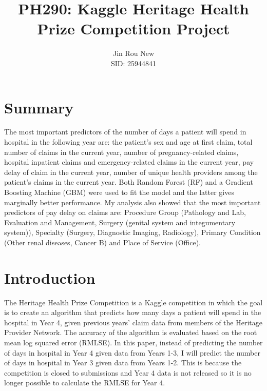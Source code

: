 \documentclass[8pt]{article}
\title{PH290: Kaggle Heritage Health Prize Competition Project}
\author{Jin Rou New\\
	SID: 25944841
	}
\date{\vspace{-5ex}} %
\begin{document}
\maketitle
%
\section{Summary}
\label{sec:summary}
The most important predictors of the number of days a patient will spend in hospital in the following year are: the patient's sex and age at first claim, total number of claims in the current year, number of pregnancy-related claims, hospital inpatient claims and emergency-related claims in the current year, pay delay of claim in the current year, number of unique health providers among the patient's claims in the current year. Both Random Forest (RF) and a Gradient Boosting Machine (GBM) were used to fit the model and the latter gives marginally better performance. My analysis also showed that the most important predictors of pay delay on claims are: Procedure Group (Pathology and Lab, Evaluation and Management, Surgery (genital system and integumentary system)), Specialty (Surgery, Diagnostic Imaging, Radiology), Primary Condition (Other renal diseases, Cancer B) and Place of Service (Office).
\section{Introduction}
\label{sec:introduction}
The Heritage Health Prize Competition is a Kaggle competition in which the goal is to create an algorithm that predicts how many days a patient will spend in the hospital in Year 4, given previous years' claim data from members of the Heritage Provider Network. The accuracy of the algorithm is evaluated based on the root mean log squared error (RMLSE). In this paper, instead of predicting the number of days in hospital in Year 4 given data from Years 1-3, I will predict the number of days in hospital in Year 3 given data from Years 1-2. This is because the competition is closed to submissions and Year 4 data is not released so it is no longer possible to calculate the RMLSE for Year 4.
\end{document}
